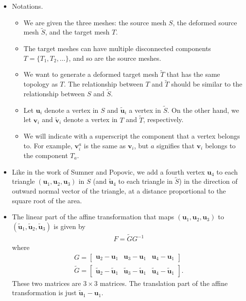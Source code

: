 \documentclass[10pt]{article}
\newcommand{\ve}[1]{\mathbf{#1}}
\begin{document}
\begin{itemize}
    \item Notations.
    \begin{itemize}    
        \item We are given the three meshes: the source mesh $S$, the deformed source mesh $\widetilde{S}$, and the target mesh $T$.
    
        \item The target meshes can have multiple disconnected components $T = \{ T_1, T_2, \dotsc \}$, and so are the source meshes.
        
        \item We want to generate a deformed target mesh $\widetilde{T}$ that has the same topology as $T$. The relationship between $T$ and $\widetilde{T}$ should be similar to the relationship between $S$ and $\widetilde{S}$.
        
        \item Let $\ve{u}_i$ denote a vertex in $S$ and $\widetilde{\ve{u}}_i$ a vertex in $\widetilde{S}$. On the other hand, we let $\ve{v}_i$ and $\widetilde{\ve{v}}_i$ denote a vertex in $T$ and $\widetilde{T}$, respectively.
        
        \item We will indicate with a superscript the component that a vertex belongs to. For example, $\ve{v}_i^a$ is the same as $\ve{v}_i$, but $a$ signifies that $\ve{v}_i$ belongs to the component $T_a$.            
    \end{itemize}
    
    \item Like in the work of Sumner and Popovic, we add a fourth vertex $\ve{u}_4$ to each triangle $(\ve{u}_1, \ve{u}_2, \ve{u}_3)$ in $S$ (and $\widetilde{\ve{u}}_4$ to each triangle in $\widetilde{S}$) in the direction of outward normal vector of the triangle, at a distance proportional to the square root of the area.
    
    \item The linear part of the affine transformation that maps $(\ve{u}_1, \ve{u}_2, \ve{u}_3)$ to $(\widetilde{\ve{u}}_1, \widetilde{\ve{u}}_2, \widetilde{\ve{u}}_3)$ is given by
    \begin{align*}
        F = \widetilde{G} G^{-1}
    \end{align*}
    where
    \begin{align*}
        G = \begin{bmatrix}
            \ve{u}_2 - \ve{u}_1 &
            \ve{u}_3 - \ve{u}_1 &
            \ve{u}_4 - \ve{u}_1
        \end{bmatrix} \\
        \widetilde{G} = \begin{bmatrix}
            \widetilde{\ve{u}}_2 - \widetilde{\ve{u}}_1 &
            \widetilde{\ve{u}}_3 - \widetilde{\ve{u}}_1 &
            \widetilde{\ve{u}}_4 - \widetilde{\ve{u}}_1
        \end{bmatrix}.
    \end{align*}
    These two matrices are $3\times 3$ matrices. The translation part of the affine transformation is just $\widetilde{\ve{u}}_1 - \ve{u}_1$.   


\end{itemize}
\end{document}
